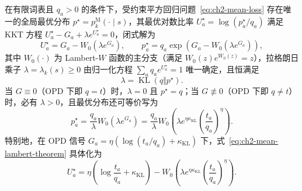 \documentclass[lang=cn,scheme=chinese,openany]{elegantbook}
\newcommand{\KL}{\operatorname{KL}}
\begin{document}
\begin{theorem}
\label{thm:ch2-mean-lambert}
\label{dyn:thm:mean-opd-explicit}
在有限词表且 $q_a>0$ 的条件下，受约束平方回归问题~\eqref{eq:ch2-mean-loss} 存在唯一的全局最优分布 $p^\star=p_k^{\mathrm M}(\cdot\mid s)$，其最优对数比率 $U_a^\star=\log(p_a^\star/q_a)$ 满足 KKT 方程 $U_a^\star-G_a+\lambda e^{U_a^\star}=0$，闭式解为
\begin{equation}
\label{eq:ch2-mean-lambert-theorem,eq:ch2-mean-lambert}
U_a^\star=G_a-W_0\!\left(\lambda e^{G_a}\right),\qquad
p_a^\star=q_a\exp\!\left(G_a-W_0(\lambda e^{G_a})\right),
\end{equation}
其中 $W_0(\cdot)$ 为 Lambert-$W$ 函数的主分支（满足 $W_0(z)e^{W_0(z)}=z$），拉格朗日乘子 $\lambda=\lambda_k(s)\ge 0$ 由归一化方程 $\sum_a q_a e^{U_a^\star}=1$ 唯一确定，且恒满足
\begin{equation}
 \lambda=\KL(q\Vert p^\star).
 \label{dyn:eq:mean-opd-multiplier-kl}
\end{equation}
当 $G\equiv 0$（OPD 下即 $q=t$）时，$\lambda=0$ 且 $p^\star=q$；当 $G\not\equiv 0$（OPD 下即 $q\ne t$）时，必有 $\lambda>0$，且最优分布还可等价写为
\begin{equation}
 p_a^\star=\frac{q_a}{\lambda}W_0\!\left(\lambda e^{G_a}\right)
 =\frac{q_a}{\lambda}W_0\left(\lambda e^{\eta\kappa_{\mathrm{KL}}}\left(\frac{t_a}{q_a}\right)^\eta\right).
 \label{dyn:eq:mean-opd-W-ratio,eq:ch2-opd-pmd-mean-infinity-prelimit}
\end{equation}
特别地，在 OPD 信号 $G_a=\eta(\log(t_a/q_a)+\kappa_{\mathrm{KL}})$ 下，式~\eqref{eq:ch2-mean-lambert-theorem} 具体化为
\begin{equation}
 U_a^\star
 =\eta\left(\log\frac{t_a}{q_a}+\kappa_{\mathrm{KL}}\right)
   -W_0\left(\lambda e^{\eta\kappa_{\mathrm{KL}}}
                      \left(\frac{t_a}{q_a}\right)^\eta\right).
 \label{dyn:eq:mean-opd-W-substituted}
\end{equation}
\end{theorem}
\end{document}
